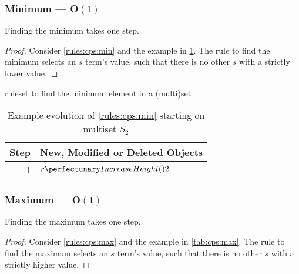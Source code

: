 \subsubsection{Minimum --- O\((1)\)}\label{sec:cps:min}

\begin{proposition}\label{prop:cps:min}
Finding the minimum takes one step.
\end{proposition}

\begin{proof}
Consider \cref{rules:cps:min} and the example in \cref{tab:cps:min}.  The rule to find the minimum selects an \(s\) term's value, such that there is no other \(s\) with a strictly lower value.
\end{proof}

\begin{cprulesetfloat}
\begin{cpruleset}
\end{cpruleset}
\caption{\label{rules:cps:min}\Gls{ruleset} to find the minimum element in a (multi)set}
\end{cprulesetfloat}

\begin{table}
\centering
\begin{tabular}{|r|l|}
    \hline
    \textbf{Step} & \textbf{New, Modified or Deleted Objects} \\ \hline
    1 & \(\cpfunc{r}{2}\)\\ \hline
\end{tabular}
\caption[Example evolution of \cref{rules:cps:min}]{\label{tab:cps:min}Example evolution of \cref{rules:cps:min} starting on multiset \(S_2\)}
\end{table}

\subsubsection{\label{sec:cps:max}Maximum --- O\((1)\)}

\begin{proposition}\label{prop:cps:max}
Finding the maximum takes one step.
\end{proposition}

\begin{proof}
Consider \cref{rules:cps:max} and the example in \cref{tab:cps:max}.  The rule to find the maximum selects an \(s\) term's value, such that there is no other \(s\) with a strictly higher value.
\end{proof}

